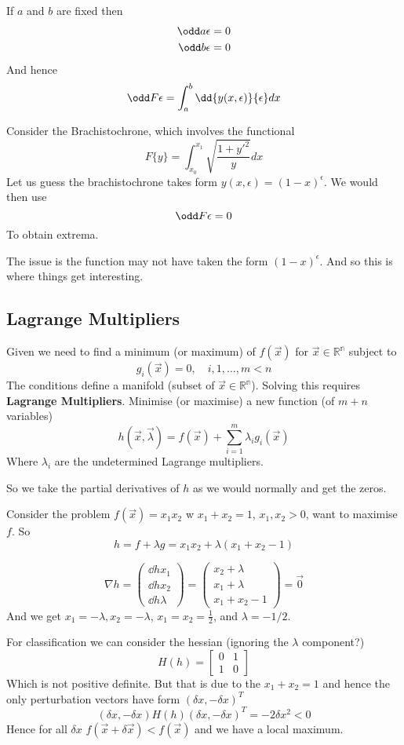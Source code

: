 \documentclass{X:/Documents/Coding/Latex/myassignment}
\begin{document}
If $a$ and $b$ are fixed then
\begin{align*}
	\odd a \epsilon = 0\\
	\odd b \epsilon = 0
\end{align*}
And hence
\[	\odd F\epsilon = \int_{a}^{b} \dd{y(x,\epsilon)}{\epsilon} dx\]


Consider the Brachistochrone, which involves the functional
\[F\{y\} = \int_{x_0}^{x_1} \sqrt{\frac{1 + y'^2}{y}} dx\]
Let us guess the brachistochrone takes form $y(x,\epsilon) = (1-x)^\epsilon$. We would then use 
\[\odd F \epsilon =0\]
To obtain extrema.


The issue is the function may not have taken the form $(1-x)^\epsilon$. And so this is where things get interesting.

\subsection{Lagrange Multipliers}
Given we need to find a minimum (or maximum) of $f(\vec x)$ for $\vec x \in \mathbb{R^n}$ subject to 
\[g_i(\vec x) = 0, \quad i,1,\hdots,m < n\]
The conditions define a manifold (subset of $\vec x \in \mathbb{R^{n}}$). Solving this requires \textbf{Lagrange Multipliers}. Minimise (or maximise) a new function (of $m+n$ variables)
\[h(\vec x,\vec \lambda) = f(\vec x) + \sum_{i=1}^m \lambda_i g_i(\vec x)\]
Where $\lambda_i$ are the undetermined Lagrange multipliers.

So we take the partial derivatives of $h$ as we would normally and get the zeros.


Consider the problem $f(\vec x) = x_1x_2$ w $x_1+x_2 = 1$, $x_1,x_2 > 0$, want to maximise $f$. So
\[h = f + \lambda g = x_1x_2 + \lambda(x_1+x_2-1)\]

\[\nabla h = \begin{pmatrix}
	\dd h{x_1} \\ \dd h{x_2}\\\dd h{\lambda}
\end{pmatrix} =  \begin{pmatrix}
	x_2 + \lambda \\
	x_1 + \lambda  \\
	x_1+x_2-1
\end{pmatrix} = \vec 0\]
And we get $x_1 = -\lambda, x_2 = -\lambda$, $x_1 = x_2 = \frac12$, and $\lambda = -1/2$.

For classification we can consider the hessian (ignoring the $\lambda$ component?)
\[H(h) = \begin{bmatrix}
	0&1\\1&0
\end{bmatrix}\]
Which is not positive definite. But that is due to the $x_1+x_2 = 1$ and hence the only perturbation vectors have form $(\delta x, -\delta x)^T$
\[(\delta x, -\delta x) H(h) (\delta x, -\delta x)^T = -2 \delta x^2 < 0\]
Hence for all $\delta x$ $f(\vec x + \delta \vec x ) < f(\vec x)$ and we have a local maximum.
\end{document}
